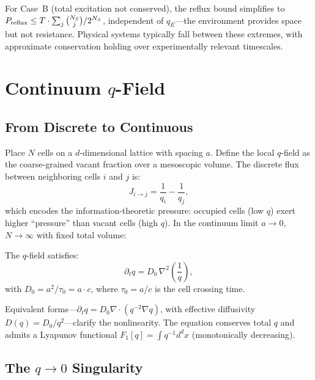 \documentclass[reprint]{revtex4-2}
\begin{document}
For Case~B (total excitation not conserved), the reflux bound simplifies to $P_{\rm reflux}\le T\cdot\sum_{j}\binom{N_S}{j}/2^{N_S}$, independent of $q_E$---the environment provides space but not resistance. Physical systems typically fall between these extremes, with approximate conservation holding over experimentally relevant timescales.

\section{Continuum $q$-Field}

\subsection{From Discrete to Continuous}

Place $N$ cells on a $d$-dimensional lattice with spacing $a$. Define the local $q$-field as the coarse-grained vacant fraction over a mesoscopic volume. The discrete flux between neighboring cells $i$ and $j$ is:
\begin{equation}
J_{i\to j} = \frac{1}{q_i} - \frac{1}{q_j},
\end{equation}
which encodes the information-theoretic pressure: occupied cells (low $q$) exert higher ``pressure'' than vacant cells (high $q$). In the continuum limit $a\to 0$, $N\to\infty$ with fixed total volume:

\begin{theorem}
\label{thm:continuum}
The $q$-field satisfies:
\begin{equation}
\boxed{\partial_t q = D_0\,\nabla^2\!\left(\frac{1}{q}\right)},
\end{equation}
with $D_0 = a^2/\tau_0 = a\cdot c$, where $\tau_0=a/c$ is the cell crossing time.
\end{theorem}

Equivalent forms---$\partial_t q = D_0\nabla\cdot(q^{-2}\nabla q)$, with effective diffusivity $D(q)=D_0/q^2$---clarify the nonlinearity. The equation conserves total $q$ and admits a Lyapunov functional $F_1[q]=\int q^{-1}d^dx$ (monotonically decreasing).

\subsection{The $q\to 0$ Singularity}
\end{document}
